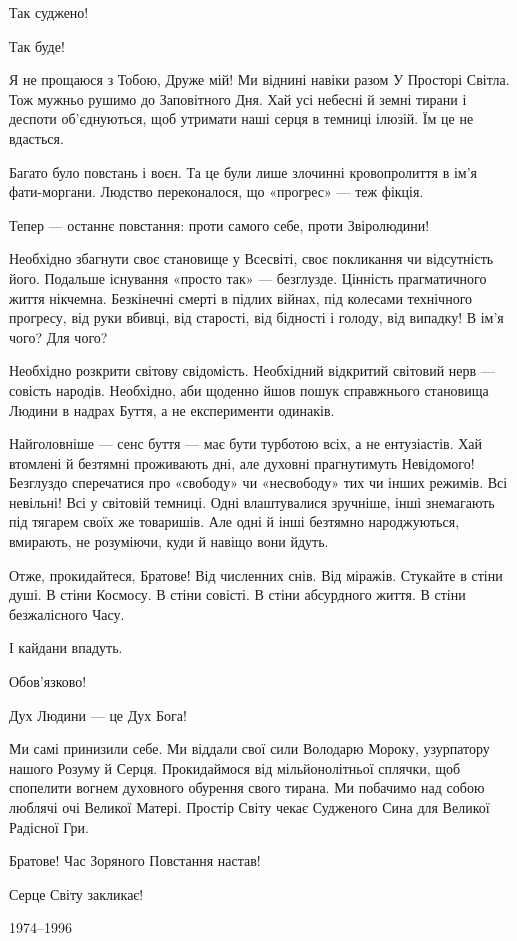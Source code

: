 Так суджено!

Так буде!

Я не прощаюся з Тобою, Друже мій! Ми віднині навіки разом У Просторі Світла.
Тож мужньо рушимо до Заповітного Дня. Хай усі небесні й земні тирани і деспоти
об’єднуються, щоб утримати наші серця в темниці ілюзій. Їм це не вдасться.

Багато було повстань і воєн. Та це були лише злочинні кровопролиття в ім’я
фати-моргани. Людство переконалося, що «прогрес» — теж фікція.

Тепер — останнє повстання: проти самого себе, проти Звіролюдини!

Необхідно збагнути своє становище у Всесвіті, своє покликання чи відсутність
його. Подальше існування «просто так» — безглузде. Цінність прагматичного життя
нікчемна. Безкінечні смерті в підлих війнах, під колесами технічного прогресу,
від руки вбивці, від старості, від бідності і голоду, від випадку! В ім’я чого?
Для чого?

Необхідно розкрити світову свідомість. Необхідний відкритий світовий нерв —
совість народів. Необхідно, аби щоденно йшов пошук справжнього становища Людини
в надрах Буття, а не експерименти одинаків.

Найголовніше — сенс буття — має бути турботою всіх, а не ентузіастів. Хай
втомлені й безтямні проживають дні, але духовні прагнутимуть Невідомого!
Безглуздо сперечатися про «свободу» чи «несвободу» тих чи інших режимів. Всі
невільні! Всі у світовій темниці. Одні влаштувалися зручніше, інші знемагають
під тягарем своїх же товаришів. Але одні й інші безтямно народжуються,
вмирають, не розуміючи, куди й навіщо вони йдуть.

Отже, прокидайтеся, Братове! Від численних снів. Від міражів. Стукайте в стіни
душі. В стіни Космосу. В стіни совісті. В стіни абсурдного життя. В стіни
безжалісного Часу.

І кайдани впадуть.

Обов’язково!

Дух Людини — це Дух Бога!

Ми самі принизили себе. Ми віддали свої сили Володарю Мороку, узурпатору нашого
Розуму й Серця. Прокидаймося від мільйонолітньої сплячки, щоб спопелити вогнем
духовного обурення свого тирана. Ми побачимо над собою люблячі очі Великої
Матері. Простір Світу чекає Судженого Сина для Великої Радісної Гри.

Братове! Час Зоряного Повстання настав!

Серце Світу закликає!

1974–1996



